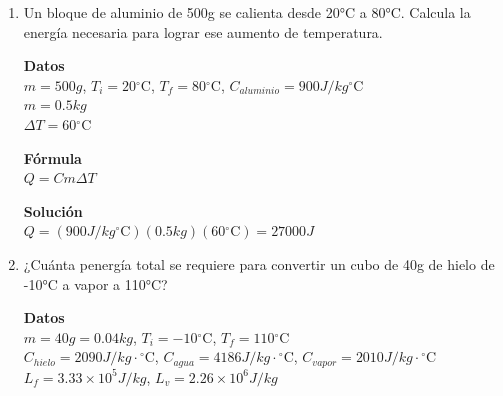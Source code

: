 \documentclass[a4paper, 11pt]{article}
\newcommand{\Pspace}{0.5cm}
\newcommand{\Aspace}{0.2cm}
\begin{document}
\begin{enumerate}
{            \textbf{Fórmula} \\
            $C = \dfrac{Q}{m \Delta T}$ \par

            \textbf{Solución} \\
            $C = \dfrac{1230 J}{(0.525 kg) (10\mathrm{^\circ C})} = 234.29 J/kg*\mathrm{^\circ C}$
        }



    \vspace{\Pspace}
    \item Un bloque de aluminio de 500g se calienta desde 20°C a 80°C. Calcula la energía necesaria para lograr ese aumento de temperatura. \par
        \vspace{\Aspace} \par
        { \color{azul}  
            \textbf{Datos} \\
            $m = 500g$, $T_{i} = 20\mathrm{^\circ C}$, $T_{f} = 80\mathrm{^\circ C}$, $C_{aluminio} = 900 J/kg\mathrm{^\circ C}$ \\
            $m = 0.5 kg$ \\
            $\Delta T = 60\mathrm{^\circ C}$ \par

            \textbf{Fórmula} \\
            $Q = C m \Delta T$

            \textbf{Solución} \\
            $Q = (900 J/kg\mathrm{^\circ C}) (0.5 kg) (60\mathrm{^\circ C}) = 27000 J$
        }



    \newpage
    \item ¿Cuánta penergía total se requiere para convertir un cubo de 40g de hielo de -10°C a vapor a 110°C? \par
        \vspace{\Aspace} \par
        { \color{azul} 
            \textbf{Datos} \\
            $m = 40g = 0.04kg$, $T_{i} = -10\mathrm{^\circ C}$, $T_{f} = 110\mathrm{^\circ C}$ \\
            $C_{hielo} = 2090 J/kg\cdot\mathrm{^\circ C}$, $C_{agua} = 4186 J/kg\cdot\mathrm{^\circ C}$, $C_{vapor} = 2010 J/kg\cdot\mathrm{^\circ C}$ \\
            $L_{f} = 3.33 \times 10^{5} J/kg$, $L_{v} = 2.26 \times 10^{6} J/kg$ \par

}
\end{enumerate}
\end{document}

